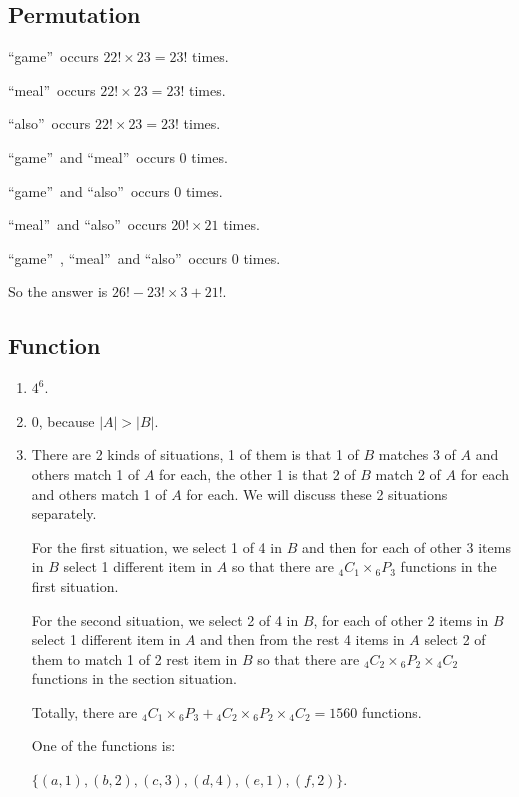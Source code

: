 \documentclass{../../cls/sig-alternate-05-2015}
\begin{document}
\subsection{Permutation}
\textquotedblleft game\textquotedblright\ occurs $22! \times 23 = 23!$ times.

\textquotedblleft meal\textquotedblright\ occurs $22! \times 23 = 23!$ times.

\textquotedblleft also\textquotedblright\ occurs $22! \times 23 = 23!$ times.

\textquotedblleft game\textquotedblright\ and \textquotedblleft meal\textquotedblright\ occurs $0$ times.

\textquotedblleft game\textquotedblright\ and \textquotedblleft also\textquotedblright\ occurs $0$ times.

\textquotedblleft meal\textquotedblright\ and \textquotedblleft also\textquotedblright\ occurs $20! \times 21$ times.

\textquotedblleft game\textquotedblright\ , \textquotedblleft meal\textquotedblright\ and \textquotedblleft also\textquotedblright\ occurs $0$ times.

So the answer is $26! - 23! \times 3 + 21!$.

\newpage

\subsection{Function}
\begin{enumerate}
	\item $4^6$.
	\item $0$, because $|A| > |B|$.
	\item There are 2 kinds of situations, 1 of them is that 1 of $B$ matches 3 of $A$ and others match 1 of $A$ for each, the other 1 is that 2 of $B$ match 2 of $A$ for each and others match 1 of $A$ for each. We will discuss these 2 situations separately.
	
	For the first situation, we select 1 of 4 in $B$ and then for each of other 3 items in $B$ select 1 different item in $A$ so that there are ${}_4 C_1 \times {}_6 P_3$ functions in the first situation.
	
	For the second situation, we select 2 of 4 in $B$, for each of other 2 items in $B$ select 1 different item in $A$ and then from the rest 4 items in $A$ select 2 of them to match 1 of 2 rest item in $B$ so that there are ${}_4 C_2 \times {}_6 P_2 \times {}_4 C_2$ functions in the section situation.
	
	Totally, there are ${}_4 C_1 \times {}_6 P_3 + {}_4 C_2 \times {}_6 P_2 \times {}_4 C_2 = 1560$ functions.
	
	One of the functions is: 
	
	$\{(a, 1), (b, 2), (c, 3), (d, 4), (e, 1), (f, 2)\}$.
\end{enumerate}
\end{document}
